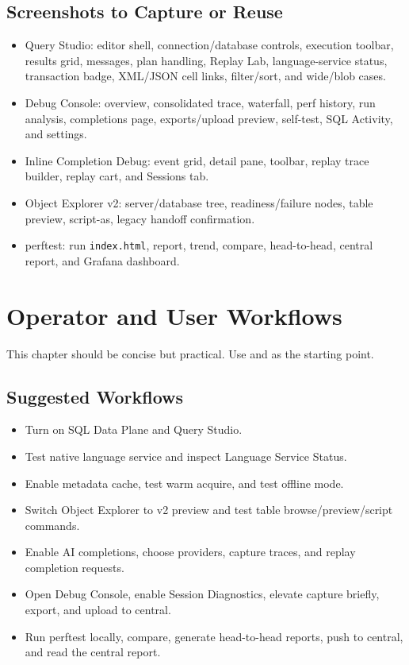 \documentclass[11pt]{article}
\newcommand{\code}[1]{\texttt{#1}}
\begin{document}
\subsection{Screenshots to Capture or Reuse}

\begin{itemize}
	\item Query Studio: editor shell, connection/database controls, execution toolbar, results grid, messages, plan handling, Replay Lab, language-service status, transaction badge, XML/JSON cell links, filter/sort, and wide/blob cases.
	\item Debug Console: overview, consolidated trace, waterfall, perf history, run analysis, completions page, exports/upload preview, self-test, SQL Activity, and settings.
	\item Inline Completion Debug: event grid, detail pane, toolbar, replay trace builder, replay cart, and Sessions tab.
	\item Object Explorer v2: server/database tree, readiness/failure nodes, table preview, script-as, legacy handoff confirmation.
	\item perftest: run \code{index.html}, report, trend, compare, head-to-head, central report, and Grafana dashboard.
\end{itemize}

\section{Operator and User Workflows}

This chapter should be concise but practical.  Use  and  as the starting point.

\subsection{Suggested Workflows}

\begin{itemize}
	\item Turn on SQL Data Plane and Query Studio.
	\item Test native language service and inspect Language Service Status.
	\item Enable metadata cache, test warm acquire, and test offline mode.
	\item Switch Object Explorer to v2 preview and test table browse/preview/script commands.
	\item Enable AI completions, choose providers, capture traces, and replay completion requests.
	\item Open Debug Console, enable Session Diagnostics, elevate capture briefly, export, and upload to central.
	\item Run perftest locally, compare, generate head-to-head reports, push to central, and read the central report.
\end{itemize}
\end{document}
